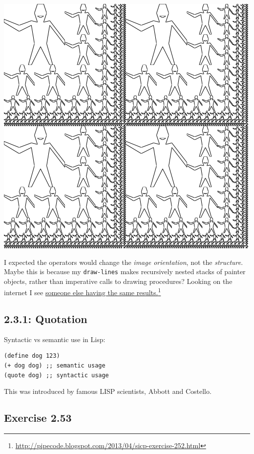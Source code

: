 \documentclass[final,fleqn,titlepage,twoside]{article}
\begin{document}
\begin{center}
\includegraphics[width=.9\linewidth]{2/pict/square-limit-identity.png}
\end{center}

I expected the operators would change the \emph{image orientation}, not the
\emph{structure}. Maybe this is because my \texttt{draw-lines} makes recursively
nested stacks of painter objects, rather than imperative calls to drawing
procedures? Looking on the internet I see \href{http://pipecode.blogspot.com/2013/04/sicp-exercise-252.html}{someone else having the same
results.}\footnote{\url{http://pipecode.blogspot.com/2013/04/sicp-exercise-252.html}}

\subsection{2.3.1: Quotation}
\label{sec:org83bb707}
Syntactic vs semantic use in Lisp:
\begin{verbatim}
(define dog 123)
(+ dog dog) ;; semantic usage
(quote dog) ;; syntactic usage
\end{verbatim}

This was introduced by famous LISP scientists, Abbott and Costello.

\subsection{Exercise 2.53}
\label{sec:orgf728fd5}
\end{document}
